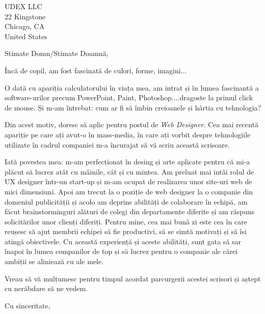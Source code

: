 \documentclass[a4paper,8pt]{letter}
\begin{document}
\signature{Chițu Raluca-Oana}
\color{gray}
\address{Chițu Raluca-Oana\\Calea București nr.67 \\ Brașov  500147\\ România}
\date{}
\begin{letter}{ UDEX LLC \\ 22 Kingstone
\\ Chicago, CA \\ United States}
\hfill\break
\hfill\break
\hfill\break
\hfill\break
\hfill\break
\hfill\break
\hfill\break

\opening{Stimate Domn/Stimate Doamnă,}
\hfill\break
\hfill\break
\hfill\break

Încă de copil, am fost fascinată de culori, forme, imagini...

O dată cu apariția calculatorului în viața mea, am intrat și în lumea fascinantă a software-urilor precum PowerPoint, Paint, Photoshop....dragoste la primul click de mouse. Și m-am întrebat:
cum ar fi să îmbin creioanele și hârtia cu tehnologia?

Din acest motiv, doresc să aplic pentru postul de \textit{Web Designer}. Cea mai recentă apariție pe care ați avut-o în mass-media, în care ați vorbit despre tehnologiile utilizate în cadrul companiei m-a încurajat să vă scriu această scrisoare. 

Iată povestea mea: m-am perfecționat în desing și arte aplicate pentru că mi-a plăcut să lucrez atât cu mâinile, cât și cu mintea. Am preluat mai intâi rolul de UX designer într-un start-up și m-am ocupat de realizarea unor site-uri web de mici dimensiuni. Apoi am trecut 
la o poziție de web designer la o companie din domeniul publicității și acolo am deprins abilități de colaborare în echipă, am făcut brainstorminguri alături de colegi din departamente diferite și am răspuns solicitărilor unor clienți diferiți. Pentru mine, cea mai bună zi este cea 
în care reușesc să ajut membrii echipei să fie productivi, să se simtă motivați și să îsi atingă obiectivele. Cu această experiență și aceste abilități, sunt gata să sar înapoi în lumea companilor de top și să lucrez pentru o companie ale cărei ambiții se aliniează cu ale mele.

Vreau să vă mulțumesc pentru timpul acordat parcurgerii acestei scrisori și aștept cu nerăbdare să ne vedem.

\hfill\break

\closing{Cu sinceritate,}

\clearpage{}
\end{letter}
\end{document}
